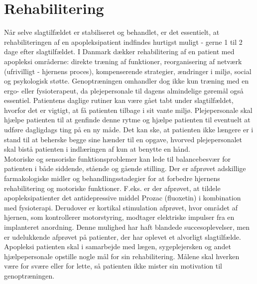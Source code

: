 \section{Rehabilitering}
Når selve slagtilfældet er stabiliseret og behandlet, er det essentielt, at rehabiliteringen af en apopleksipatient indfindes hurtigst muligt - gerne 1 til 2 dage efter slagtilfældet. I Danmark dækker rehabilitering af en patient med apopleksi områderne: direkte træning af funktioner, reorganisering af netværk (ufrivilligt - hjernens proces), kompenserende strategier, ændringer i miljø, social og psykologisk støtte. Genoptræningen omhandler dog ikke kun træning med en ergo- eller fysioterapeut, da plejepersonale til dagens almindelige gøremål også essentiel. Patientens daglige rutiner kan være gået tabt under slagtilfældet, hvorfor det er vigtigt, at få patienten tilbage i sit vante miljø. Plejepersonale skal hjælpe patienten til at genfinde denne rytme og hjælpe patienten til eventuelt at udføre dagligdags ting på en ny måde. Det kan ske, at patienten ikke længere er i stand til at beherske begge sine hænder til en opgave, hvorved plejepersonalet skal bistå patienten i indlæringen af kun at benytte en hånd. \\ 
Motoriske og sensoriske funktionsproblemer kan lede til balancebesvær for patienten i både siddende, stående og gående stilling. Der er afprøvet adskillige farmakologiske midler og behandlingsstadegier for at forbedre hjernens rehabilitering og motoriske funktioner. F.eks. er der afprøvet, at tildele apopleksipatienter det antidepressive middel Prozac (fluoxetin) i kombination med fysioterapi. Derudover er kortikal stimulation afprøvet, hvor området af hjernen, som kontrollerer motorstyring, modtager elektriske impulser fra en implanteret anordning. Denne mulighed har haft blandede succesoplevelser, men er udelukkende afprøvet på patienter, der har oplevet et alvorligt slagtilfælde. \cite{Academic2015} \\  
Apopleksi patienten skal i samarbejde med lægen, sygeplejersken og andet hjælpepersonale opstille nogle mål for sin rehabilitering. Målene skal hverken være for svære eller for lette, så patienten ikke mister sin motivation til genoptræningen. \cite{Kruuse2015} \\ 

